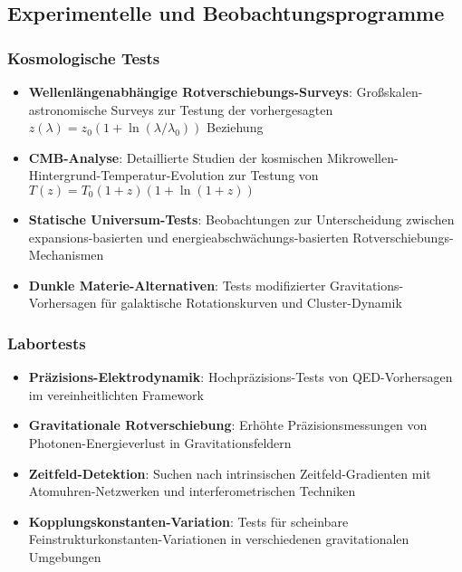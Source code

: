 \documentclass[12pt,a4paper]{article}
\begin{document}
	\subsection{Experimentelle und Beobachtungsprogramme}
	\label{subsec:experimental_programs}
	
	\subsubsection{Kosmologische Tests}
	\label{subsubsec:cosmological_tests}
	
	\begin{itemize}
		\item \textbf{Wellenlängenabhängige Rotverschiebungs-Surveys}: Großskalen-astronomische Surveys zur Testung der vorhergesagten $z(\lambda) = z_0(1 + \ln(\lambda/\lambda_0))$ Beziehung
		\item \textbf{CMB-Analyse}: Detaillierte Studien der kosmischen Mikrowellen-Hintergrund-Temperatur-Evolution zur Testung von $T(z) = T_0(1+z)(1+\ln(1+z))$
		\item \textbf{Statische Universum-Tests}: Beobachtungen zur Unterscheidung zwischen expansions-basierten und energieabschwächungs-basierten Rotverschiebungs-Mechanismen
		\item \textbf{Dunkle Materie-Alternativen}: Tests modifizierter Gravitations-Vorhersagen für galaktische Rotationskurven und Cluster-Dynamik
	\end{itemize}
	
	\subsubsection{Labortests}
	\label{subsubsec:laboratory_tests}
	
	\begin{itemize}
		\item \textbf{Präzisions-Elektrodynamik}: Hochpräzisions-Tests von QED-Vorhersagen im vereinheitlichten Framework
		\item \textbf{Gravitationale Rotverschiebung}: Erhöhte Präzisionsmessungen von Photonen-Energieverlust in Gravitationsfeldern
		\item \textbf{Zeitfeld-Detektion}: Suchen nach intrinsischen Zeitfeld-Gradienten mit Atomuhren-Netzwerken und interferometrischen Techniken
		\item \textbf{Kopplungskonstanten-Variation}: Tests für scheinbare Feinstrukturkonstanten-Variationen in verschiedenen gravitationalen Umgebungen
	\end{itemize}
	
\end{document}
